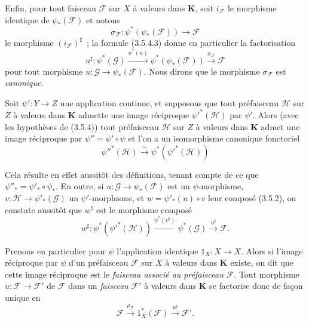 \begin{env}[3.5.4]
Enfin, pour tout faisceau $\mathcal{F}$ sur $X$ à valeurs dans
$\mathbf{K}$, soit $i_{\mathcal{F}}$ le morphisme identique de
$\psi_*(\mathcal{F})$ et notons
\[
  \sigma_{\mathcal{F}}:
  \psi^*(\psi_*(\mathcal{F}))\to\mathcal{F}
\]
le morphisme $(i_{\mathcal{F}})^\sharp$~; la formule (3.5.4.3) donne en
particulier la factorisation
\begin{equation*}
  u^\sharp:\psi^*(\mathcal{G})
  \xrightarrow{\psi^*(u)}
  \psi^*(\psi_*(\mathcal{F}))
  \xrightarrow{\sigma_{\mathcal{F}}}\mathcal{F}
\tag{3.5.4.4}\label{0.3.5.4.4-fr}
\end{equation*}
pour tout morphisme $u:\mathcal{G}\to\psi_*(\mathcal{F})$. Nous dirons que le
morphisme $\sigma_{\mathcal{F}}$ est \emph{canonique}.
\end{env}

\begin{env}[3.5.5]
\label{0.3.5.5-fr}
Soit $\psi':Y\to Z$ une application continue, et supposons que tout
préfaisceau $\mathcal{H}$ sur $Z$ à valeurs dans $\mathbf{K}$ admette une
image réciproque $\psi'^*(\mathcal{H})$ par $\psi'$. Alors (avec les
hypothèses de (3.5.4)) tout préfaisceau $\mathcal{H}$ sur $Z$ à valeurs dans
$\mathbf{K}$ admet une image réciproque par $\psi''=\psi'\circ\psi$ et l'on a
un isomorphisme canonique fonctoriel
\begin{equation*}
  \psi''^*(\mathcal{H})\xrightarrow{\sim}
  \psi^*(\psi'^*(\mathcal{H}))
\tag{3.5.5.1}\label{0.3.5.5.1-fr}
\end{equation*}


Cela résulte en effet aussitôt des définitions, tenant compte de ce que
$\psi''_*=\psi'_*\circ\psi_*$. En outre, si
$u:\mathcal{G}\to\psi_*(\mathcal{F})$ est un $\psi$-morphisme,
$v:\mathcal{H}\to\psi'_*(\mathcal{G})$ un $\psi'$-morphisme, et
$w=\psi'_*(u)\circ v$ leur composé (3.5.2), on constate aussitôt que
$w^\sharp$ est le morphisme composé
\[
  w^\sharp:\psi^*(\psi'^*(\mathcal{H}))
  \xrightarrow{\psi^*(v^\sharp)}
  \psi^*(\mathcal{G})
  \xrightarrow{u^\sharp}\mathcal{F}.
\]
\end{env}

\begin{env}[3.5.6]
\label{0.3.5.6-fr}
Prenons en particulier pour $\psi$ l'application identique
$1_X:X\to X$. Alors si l'image réciproque par $\psi$ d'un préfaisceau
$\mathcal{F}$ sur $X$ à valeurs dans $\mathbf{K}$ existe, on dit que cette
image réciproque est le \emph{faisceau associé au préfaisceau $\mathcal{F}$}.
Tout morphisme $u:\mathcal{F}\to\mathcal{F}'$ de $\mathcal{F}$ dans un
\emph{faisceau} $\mathcal{F}'$ à valeurs dans $\mathbf{K}$ se factorise donc
de façon unique en
\[
  \mathcal{F}\xrightarrow{\rho_{\mathcal{F}}}
  1_X^*(\mathcal{F})\xrightarrow{u^\sharp}\mathcal{F}'.
\]
\end{env}

